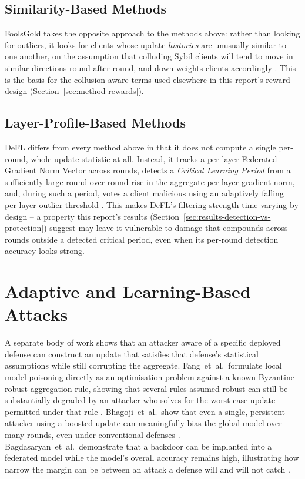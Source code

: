 \subsection{Similarity-Based Methods}
FoolsGold takes the opposite approach to the methods above: rather than looking for outliers, it looks for clients whose update \emph{histories} are unusually similar to one another, on the assumption that colluding Sybil clients will tend to move in similar directions round after round, and down-weights clients accordingly \citep{foolsgold}. This is the basis for the collusion-aware terms used elsewhere in this report's reward design (Section~\ref{sec:method-rewards}).

\subsection{Layer-Profile-Based Methods}
DeFL differs from every method above in that it does not compute a single per-round, whole-update statistic at all. Instead, it tracks a per-layer Federated Gradient Norm Vector across rounds, detects a \emph{Critical Learning Period} from a sufficiently large round-over-round rise in the aggregate per-layer gradient norm, and, during such a period, votes a client malicious using an adaptively falling per-layer outlier threshold \citep{defl}. This makes DeFL's filtering strength time-varying by design -- a property this report's results (Section~\ref{sec:results-detection-vs-protection}) suggest may leave it vulnerable to damage that compounds across rounds outside a detected critical period, even when its per-round detection accuracy looks strong.

\section{Adaptive and Learning-Based Attacks}
\label{sec:lit-attacks}

A separate body of work shows that an attacker aware of a specific deployed defense can construct an update that satisfies that defense's statistical assumptions while still corrupting the aggregate. Fang~et~al.\ formulate local model poisoning directly as an optimisation problem against a known Byzantine-robust aggregation rule, showing that several rules assumed robust can still be substantially degraded by an attacker who solves for the worst-case update permitted under that rule \citep{fang2020}. Bhagoji~et~al.\ show that even a single, persistent attacker using a boosted update can meaningfully bias the global model over many rounds, even under conventional defenses \citep{bhagoji2019}. Bagdasaryan~et~al.\ demonstrate that a backdoor can be implanted into a federated model while the model's overall accuracy remains high, illustrating how narrow the margin can be between an attack a defense will and will not catch \citep{bagdasaryan2020}.

